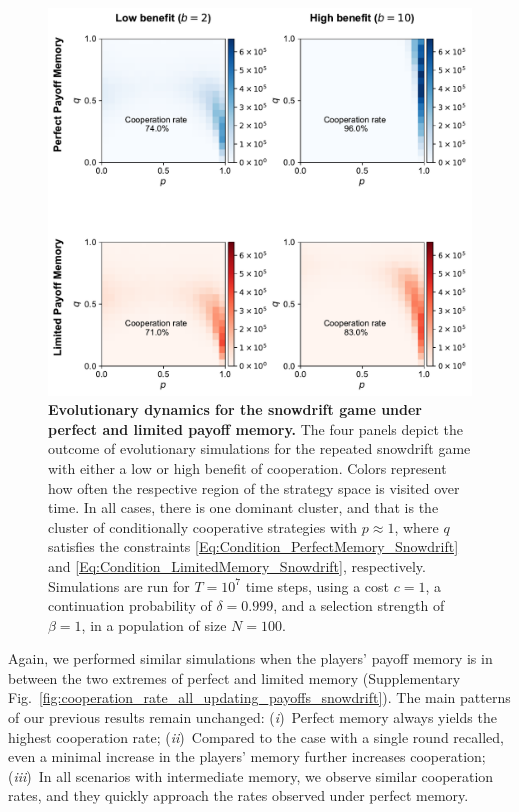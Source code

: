 \documentclass[11pt]{article}
\theoremstyle{plainCl1}
\theoremstyle{plainCl2}
\begin{document}
\begin{figure}[t]
  \centering
  \includegraphics[width=.75\textwidth]{static/snowdrift_game_results.pdf}
  \caption{{\bf Evolutionary dynamics for the snowdrift game under perfect and limited payoff memory.}
The four panels depict the outcome of evolutionary simulations for the repeated
snowdrift game with either a low or high benefit of cooperation. 
Colors represent how often the respective region of the strategy space is
visited over time.
In all cases, there is one dominant cluster, and that is the cluster of
conditionally cooperative strategies with \(p \approx 1\), where \(q\) satisfies
the constraints \eqref{Eq:Condition_PerfectMemory_Snowdrift} and
\eqref{Eq:Condition_LimitedMemory_Snowdrift}, respectively.
Simulations are run for \(T = 10^7\) time steps, using a cost \(c = 1\), a
continuation probability of \(\delta = 0.999\), and a selection strength of
\(\beta = 1\), in a population of size \(N = 100\).}
\label{fig:expected_and_stochastic_for_snowdrift}
\end{figure}

Again, we performed similar simulations when the players' payoff memory is 
in between the two extremes of perfect and limited memory (Supplementary
Fig.~\ref{fig:cooperation_rate_all_updating_payoffs_snowdrift}).
The main patterns of our previous results remain unchanged: ({\it i})~Perfect
memory always yields the highest cooperation rate; ({\it ii})~Compared to the 
case with a single round recalled, even a minimal increase in the players'
memory further increases cooperation; ({\it iii})~In all scenarios with
intermediate memory, we observe similar cooperation rates, and they quickly approach
the rates observed under perfect memory. 
\end{document}
